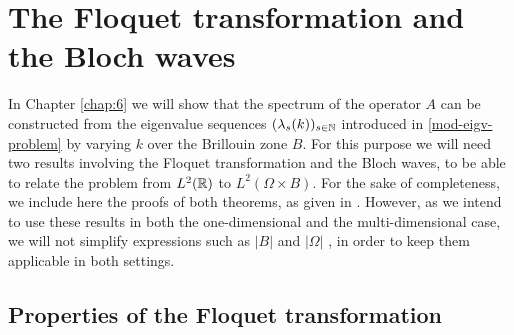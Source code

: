 \chapter{The Floquet transformation and the Bloch waves} \label{chap:5}

In Chapter \ref{chap:6} we will show that the spectrum of the operator $A$ can be constructed from the eigenvalue sequences $(\lambda_{s}(k))_{s \in \mathbb{N}}$ introduced in \eqref{mod-eigv-problem} by varying $k$ over the Brillouin zone $B$. For this purpose we will need two results involving the Floquet transformation and the Bloch waves, to be able to relate the problem from $L^{2}(\mathbb{R})$ to $L^{2}(\Omega \times B)$. For the sake of completeness, we include here the proofs of both theorems, as given in \cite[Section 3.4, 3.5]{dorfler2011photonic}. However, as we intend to use these results in both the one-dimensional and the multi-dimensional case, we will not simplify expressions such as $|B|$ and $|\Omega|$ , in order to keep them applicable in both settings.

\section{Properties of the Floquet transformation} \label{sec:5.1}

